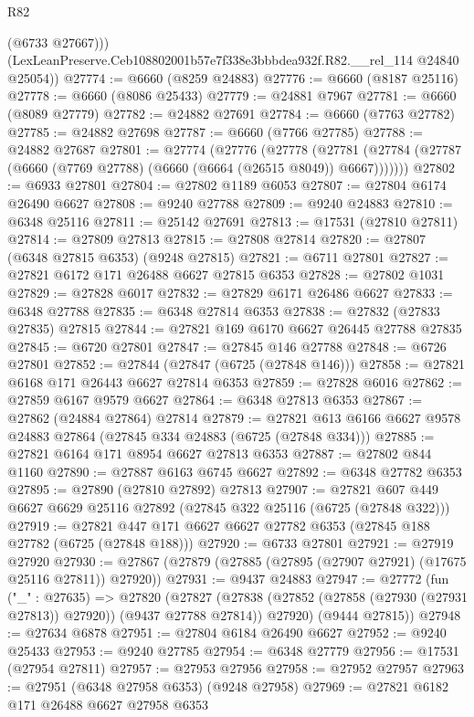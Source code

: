 \begin{lexlean}{R82}
\begin{coremodule}
          (@6733 @27667)))
      (LexLeanPreserve.Ceb108802001b57e7f338e3bbbdea932f.R82.__rel_114 @24840 @25054))
@27774 := @6660 (@8259 @24883)
@27776 := @6660 (@8187 @25116)
@27778 := @6660 (@8086 @25433)
@27779 := @24881 @7967
@27781 := @6660 (@8089 @27779)
@27782 := @24882 @27691
@27784 := @6660 (@7763 @27782)
@27785 := @24882 @27698
@27787 := @6660 (@7766 @27785)
@27788 := @24882 @27687
@27801 := @27774
    (@27776
      (@27778
        (@27781 (@27784 (@27787 (@6660 (@7769 @27788) (@6660 (@6664 (@26515 @8049)) @6667)))))))
@27802 := @6933 @27801
@27804 := @27802 @1189 @6053
@27807 := @27804 @6174 @26490 @6627
@27808 := @9240 @27788
@27809 := @9240 @24883
@27810 := @6348 @25116
@27811 := @25142 @27691
@27813 := @17531 (@27810 @27811)
@27814 := @27809 @27813
@27815 := @27808 @27814
@27820 := @27807 (@6348 @27815 @6353) (@9248 @27815)
@27821 := @6711 @27801
@27827 := @27821 @6172 @171 @26488 @6627 @27815 @6353
@27828 := @27802 @1031
@27829 := @27828 @6017
@27832 := @27829 @6171 @26486 @6627
@27833 := @6348 @27788
@27835 := @6348 @27814 @6353
@27838 := @27832 (@27833 @27835) @27815
@27844 := @27821 @169 @6170 @6627 @26445 @27788 @27835
@27845 := @6720 @27801
@27847 := @27845 @146 @27788
@27848 := @6726 @27801
@27852 := @27844 (@27847 (@6725 (@27848 @146)))
@27858 := @27821 @6168 @171 @26443 @6627 @27814 @6353
@27859 := @27828 @6016
@27862 := @27859 @6167 @9579 @6627
@27864 := @6348 @27813 @6353
@27867 := @27862 (@24884 @27864) @27814
@27879 := @27821 @613 @6166 @6627 @9578 @24883 @27864 (@27845 @334 @24883 (@6725 (@27848 @334)))
@27885 := @27821 @6164 @171 @8954 @6627 @27813 @6353
@27887 := @27802 @844 @1160
@27890 := @27887 @6163 @6745 @6627
@27892 := @6348 @27782 @6353
@27895 := @27890 (@27810 @27892) @27813
@27907 := @27821 @607 @449 @6627 @6629 @25116 @27892 (@27845 @322 @25116 (@6725 (@27848 @322)))
@27919 := @27821 @447 @171 @6627 @6627 @27782 @6353 (@27845 @188 @27782 (@6725 (@27848 @188)))
@27920 := @6733 @27801
@27921 := @27919 @27920
@27930 := @27867 (@27879 (@27885 (@27895 (@27907 @27921) (@17675 @25116 @27811)) @27920))
@27931 := @9437 @24883
@27947 := @27772
    (fun ("_" : @27635) =>
    @27820
      (@27827
        (@27838 (@27852 (@27858 (@27930 (@27931 @27813)) @27920)) (@9437 @27788 @27814))
        @27920)
      (@9444 @27815))
@27948 := @27634 @6878
@27951 := @27804 @6184 @26490 @6627
@27952 := @9240 @25433
@27953 := @9240 @27785
@27954 := @6348 @27779
@27956 := @17531 (@27954 @27811)
@27957 := @27953 @27956
@27958 := @27952 @27957
@27963 := @27951 (@6348 @27958 @6353) (@9248 @27958)
@27969 := @27821 @6182 @171 @26488 @6627 @27958 @6353

\end{coremodule}
\end{lexlean}
